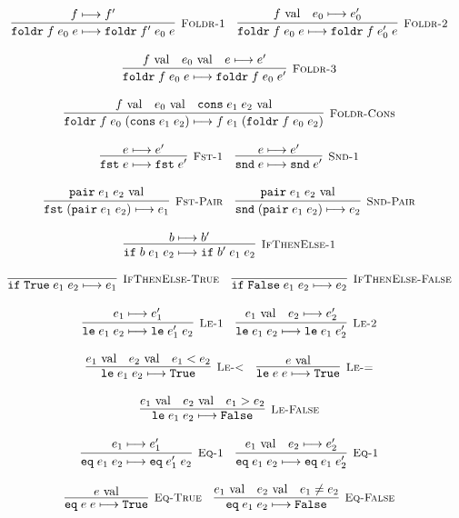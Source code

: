 \documentclass[10pt]{article}
\newcommand{\ttt}[1]{\texttt{#1}}
\newcommand{\reduces}{\ensuremath{\longmapsto}}
\newcommand{\val}{\textnormal{ val}}
\newcommand{\True}{\ttt{True}}
\newcommand{\False}{\ttt{False}}
\newcommand{\cons}{\ttt{cons}}
\newcommand{\foldr}{\ttt{foldr}}
\newcommand{\pair}{\ttt{pair}}
\newcommand{\fst}{\ttt{fst}}
\newcommand{\snd}{\ttt{snd}}
\newcommand{\ite}{\ttt{if}}
\newcommand{\lesseq}{\ttt{le}}
\newcommand{\eq}{\ttt{eq}}
\newcommand{\labinfer} [3] [] {\infer[{\small\textsc{#1}}]{#2}{#3}}
\begin{document}
\[\begin{array}{cc}
    \labinfer[Foldr-1]{\foldr\; f\; e_0\; e \reduces \foldr\; f'\; e_0\; e}{f \reduces f'}
    ~~~
    \labinfer[Foldr-2]{\foldr\; f\; e_0\; e \reduces \foldr\; f\; e_0'\; e}{f \val & e_0 \reduces e_0'}
    \\\\
    \labinfer[Foldr-3]{\foldr\; f\; e_0\; e \reduces \foldr\; f\; e_0\; e'}{f \val & e_0 \val & e \reduces e'}
    \\\\
    \labinfer[Foldr-Cons]{\foldr\; f\; e_0\; (\cons\; e_1\; e_2) \reduces f\; e_1\; (\foldr\; f\; e_0\; e_2)}{f \val & e_0 \val & \cons\; e_1\; e_2 \val}
    \\\\
    \labinfer[Fst-1]{\fst\; e \reduces \fst\; e'}{e \reduces e'}
    ~~~
    \labinfer[Snd-1]{\snd\; e \reduces \snd\; e'}{e \reduces e'}
    \\\\
    \labinfer[Fst-Pair]{\fst\; (\pair\; e_1\; e_2) \reduces e_1}{\pair\; e_1\; e_2 \val}
    ~~~
    \labinfer[Snd-Pair]{\snd\; (\pair\; e_1\; e_2) \reduces e_2}{\pair\; e_1\; e_2 \val}
    \\\\
    \labinfer[IfThenElse-1]{\ite\; b\; e_1\; e_2 \reduces \ite\; b'\; e_1\; e_2}{b \reduces b'}
    \\\\
    \labinfer[IfThenElse-True]{\ite\; \True\; e_1\; e_2 \reduces e_1}{}
    ~~~
    \labinfer[IfThenElse-False]{\ite\; \False\; e_1\; e_2 \reduces e_2}{}
    \\\\
    \labinfer[Le-1]{\lesseq\; e_1\; e_2 \reduces \lesseq\; e_1'\; e_2}{e_1 \reduces e_1'}
    ~~~
    \labinfer[Le-2]{\lesseq\; e_1\; e_2 \reduces \lesseq\; e_1\; e_2'}{e_1 \val & e_2 \reduces e_2'}
    \\\\
    \labinfer[Le-<]{\lesseq\; e_1\; e_2 \reduces \True}{e_1 \val & e_2 \val & e_1 < e_2}
    ~~~
    \labinfer[Le-=]{\lesseq\; e\; e \reduces \True}{e \val}
    \\\\
    \labinfer[Le-False]{\lesseq\; e_1\; e_2 \reduces \False}{e_1 \val & e_2 \val & e_1 > e_2}
    \\\\
    \labinfer[Eq-1]{\eq\; e_1\; e_2 \reduces \eq\; e_1'\; e_2}{e_1 \reduces e_1'}
    ~~~
    \labinfer[Eq-1]{\eq\; e_1\; e_2 \reduces \eq\; e_1\; e_2'}{e_1 \val & e_2 \reduces e_2'}
    \\\\
    \labinfer[Eq-True]{\eq\; e\; e \reduces \True}{e \val}
    ~~~
    \labinfer[Eq-False]{\eq\; e_1\; e_2 \reduces \False}{e_1 \val & e_2 \val & e_1 \neq e_2}

  \end{array}
\]
\end{document}
